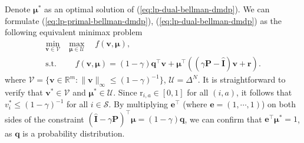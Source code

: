 \documentclass[12pt]{article}
\begin{document}
Denote $\boldsymbol{\mu}^*$ as an optimal solution of (\ref{eq:lp-dual-bellman-dmdp}). We can formulate (\ref{eq:lp-primal-bellman-dmdp}), (\ref{eq:lp-dual-bellman-dmdp}) as the following equivalent minimax problem
\begin{equation}
    \label{eq:lp-minimax-bellman-dmdp}
    \begin{aligned}
        \min_{\boldsymbol{v} \in \mathcal{V}} &  \max_{\boldsymbol{\mu} \in \mathcal{U}} \quad  f(\boldsymbol{v},\boldsymbol{\mu}),\\
        \text{s.t.}& \quad  f(\boldsymbol{v},\boldsymbol{\mu}) = (1 - \gamma) \boldsymbol{q}^{\top} \boldsymbol{v} + \boldsymbol{\mu}^{\top} ((\gamma \boldsymbol{\text{P}} - \hat{\boldsymbol{\text{I}}}) \boldsymbol{v} + \boldsymbol{\text{r}}).
    \end{aligned}
\end{equation}
where $\mathcal{V} = \{\boldsymbol{v} \in \mathbb{R}^m: \|\boldsymbol{v}\|_{\infty} \le (1-\gamma)^{-1}\}$, $\mathcal{U} = \Delta^{N}$. It is straightforward to verify that $\boldsymbol{v}^* \in \mathcal{V}$ and $\boldsymbol{\mu}^* \in \mathcal{U}$. Since $\text{r}_{i,a} \in [0,1]$ for all $(i,a)$, it follows that $v_i^* \le (1-\gamma)^{-1}$ for all $i \in \mathcal{S}$. By multiplying $\boldsymbol{e}^{\top}$ (where $\boldsymbol{e} = (1,\cdots,1)$) on both sides of the constraint $(\hat{\boldsymbol{\text{I}}} - \gamma \boldsymbol{\text{P}})^{\top} \boldsymbol{\mu} = (1 - \gamma) \boldsymbol{q}$, we can confirm that $\boldsymbol{e}^{\top} \boldsymbol{\mu}^* = 1$, as $\boldsymbol{q}$ is a probability distribution.


\end{document}
